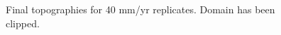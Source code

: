 \documentclass[a4paper]{article}
\begin{document}
\begin{appendices}
\begin{figure}[!ht]
	\caption{Final topographies for 40 mm/yr replicates. Domain has been clipped.}
	\label{fig:040topo}
\end{figure}
\clearpage

%
%

\end{appendices}

\clearpage
{}

\end{document}
